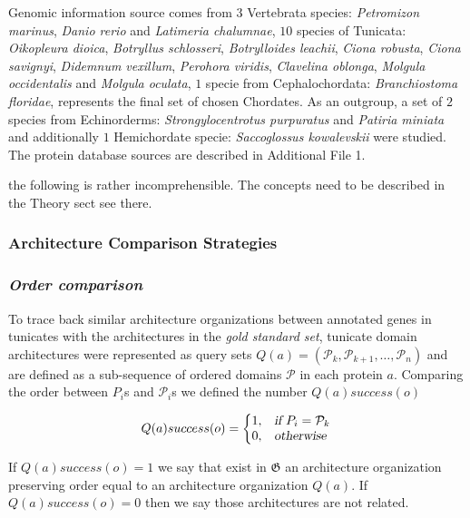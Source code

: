 \documentclass[11pt]{article}
\newcommand{\TODO}[1]{\begingroup\color{red}#1\endgroup}
\begin{document}
Genomic information source comes from $3$ Vertebrata species:
\textit{Petromizon marinus}, \textit{Danio rerio} and 
\textit{Latimeria chalumnae}, $10$ species of Tunicata: \textit{Oikopleura 
dioica}, \textit{Botryllus schlosseri}, \textit{Botrylloides 
leachii}, \textit{Ciona robusta}, \textit{Ciona savignyi}, \textit{Didemnum 
vexillum}, \textit{Perohora viridis}, \textit{Clavelina oblonga}, 
\textit{Molgula occidentalis} and \textit{Molgula oculata}, $1$ specie 
from Cephalochordata: \textit{Branchiostoma floridae}, represents the final set 
of chosen Chordates. As an outgroup, a set of $2$ species from Echinorderms: 
\textit{Strongylocentrotus purpuratus} and \textit{Patiria miniata} and 
additionally $1$ Hemichordate specie: \textit{Saccoglossus kowalevskii} were 
studied. The protein database sources are described in Additional File 1. 

\TODO{the following is rather incomprehensible. The concepts need to be described in the Theory sect 
see there.} 

\subsubsection*{Architecture Comparison Strategies}
\subsubsection*{\textit{\textbf{O}rder comparison}}

To trace back similar architecture organizations between annotated genes in 
tunicates with the architectures in the \textsl{gold standard set}, tunicate 
domain architectures were represented as query sets  $Q(a) = 
(\mathcal{P}_k,\mathcal{P}_{k+1},\ldots,\mathcal{P}_n)$ and are defined as a 
sub-sequence of ordered domains $\mathcal{P}$ in each protein $a$. Comparing 
the order between $P_i$s and $\mathcal{P}_i$s we defined the number 
$Q(a){success}(o)$

\begin{equation}
  Q(a){success(o)}=\left\{
  \begin{array}{@{}ll@{}}
    1, & \textsl{if}\ P_{i} = \mathcal{P}_{k} \\
    0, & \textsl{otherwise}
  \end{array}\right.
\end{equation} 

If $Q(a){success(o)} = 1$ we say that exist in $\boldsymbol{\mathfrak{G}}$ 
an architecture organization preserving order equal to an architecture 
organization $Q(a)$. If $Q(a){success(o)} = 0$ then we say those 
architectures are not related.
\end{document}
